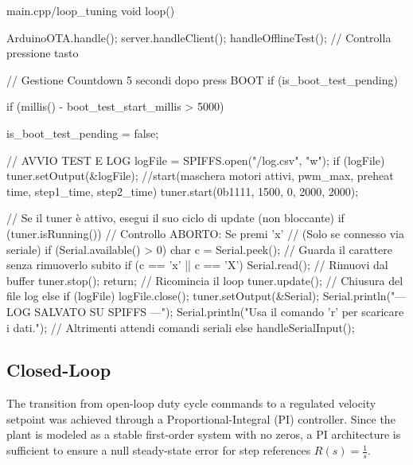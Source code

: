 \begin{vscode}{main.cpp/loop\_tuning}
void loop() {
  ArduinoOTA.handle();
  server.handleClient();  
  handleOfflineTest(); // Controlla pressione tasto

  // Gestione Countdown 5 secondi dopo press BOOT
  if (is_boot_test_pending) {
    if (millis() - boot_test_start_millis > 5000) {
      is_boot_test_pending = false;
      
      // AVVIO TEST E LOG
      logFile = SPIFFS.open("/log.csv", "w");
      if (logFile) {
        tuner.setOutput(&logFile);
        //start(maschera motori attivi, pwm_max, preheat time, step1_time, step2_time)
        tuner.start(0b1111, 1500, 0, 2000, 2000); 
      }
    }
  }

  // Se il tuner è attivo, esegui il suo ciclo di update (non bloccante)
  if (tuner.isRunning()) {
    // Controllo ABORTO: Se premi 'x'
    // (Solo se connesso via seriale)
    if (Serial.available() > 0) {
      char c = Serial.peek(); // Guarda il carattere senza rimuoverlo subito
      if (c == 'x' || c == 'X') {
        Serial.read(); // Rimuovi dal buffer
        tuner.stop();
        return; // Ricomincia il loop
      }
    }
    tuner.update();
  }
  // Chiusura del file log
  else if (logFile) {
    logFile.close();
    tuner.setOutput(&Serial); 
    Serial.println("\n--- LOG SALVATO SU SPIFFS ---");
    Serial.println("Usa il comando 'r' per scaricare i dati.");
  }
  // Altrimenti attendi comandi seriali
  else {
    handleSerialInput();
  }
}
\end{vscode}


\subsection{Closed-Loop}
The transition from open-loop duty cycle commands to a regulated velocity setpoint was achieved through a Proportional-Integral (PI) controller. Since the plant is modeled as a stable first-order system with no zeros, a PI architecture is sufficient to ensure a null steady-state error for step references $R(s) = \frac{1}{s}$.

